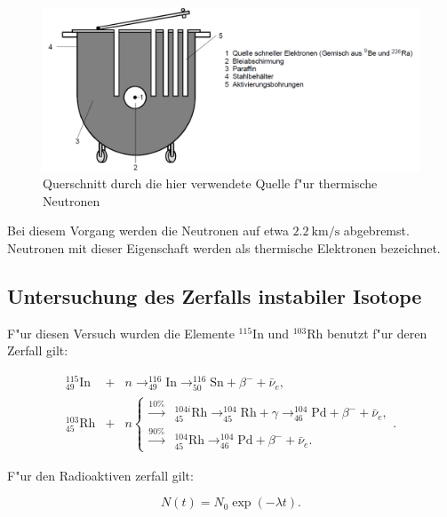 		\begin{figure}[htbp]
			\centering
			\includegraphics[width = 12cm]{img/Quelle.PNG}
			\caption{Querschnitt durch die hier verwendete Quelle f"ur thermische Neutronen}
			\label{quelle}
		\end{figure}

		Bei diesem Vorgang werden die Neutronen auf etwa $\SI{2.2}{\kilo\meter\per\second}$ abgebremst. Neutronen mit dieser Eigenschaft werden als thermische Elektronen bezeichnet.

	\subsection{Untersuchung des Zerfalls instabiler Isotope}
	\label{sub:untersuchung_des_zerfalls_instabiler_isotope}
	
		F"ur diesen Versuch wurden die Elemente $^{115}\mathrm{In}$ und $^{103}\mathrm{Rh}$ benutzt f"ur deren Zerfall gilt:

		\begin{eqnarray*}
			^{115}_{49}\mathrm{In} &+& n \rightarrow ^{116}_{49}\mathrm{In} \rightarrow ^{116}_{50}\mathrm{Sn} + \beta^- + \bar{\nu}_e,\\
			^{103}_{45}\mathrm{Rh} &+& n \left\{
			\begin{array}{ll}
			 	 \xrightarrow{10\%} & ^{104i}_{45}\mathrm{Rh} \rightarrow ^{104}_{45}\mathrm{Rh} + \gamma \rightarrow ^{104}_{46}\mathrm{Pd} +\beta^- +\bar{\nu}_e,\\
			 	  \xrightarrow{90\%} & ^{104}_{45}\mathrm{Rh} \rightarrow ^{104}_{46}\mathrm{Pd} +\beta^- +\bar{\nu}_e.
			\end{array}.
			\right.
		\end{eqnarray*}

		F"ur den Radioaktiven zerfall gilt:

		\begin{equation}
			N(t) = N_0 \exp{(-\lambda t)}. \label{zerfall}
		\end{equation}

